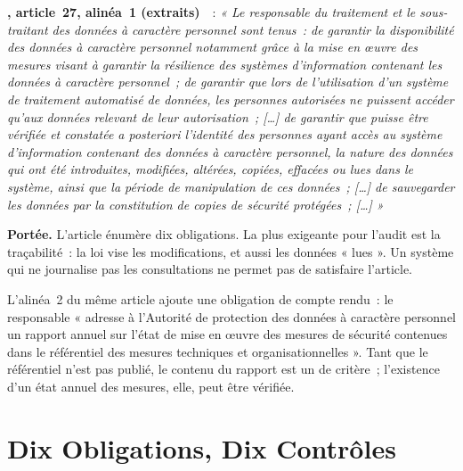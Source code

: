 \begin{boxjuris}
\textbf{, article~27, alinéa~1 (extraits)}~\cite{loi2024017}~:
\textit{« Le responsable du traitement et le sous-traitant des données à
caractère personnel sont tenus~: de garantir la disponibilité des données à
caractère personnel notamment grâce à la mise en œuvre des mesures visant à
garantir la résilience des systèmes d'information contenant les données à
caractère personnel~; de garantir que lors de l'utilisation d'un système de
traitement automatisé de données, les personnes autorisées ne puissent
accéder qu'aux données relevant de leur autorisation~; [\ldots] de
garantir que puisse être vérifiée et constatée a posteriori l'identité des
personnes ayant accès au système d'information contenant des données à
caractère personnel, la nature des données qui ont été introduites,
modifiées, altérées, copiées, effacées ou lues dans le système, ainsi que
la période de manipulation de ces données~; [\ldots] de sauvegarder les
données par la constitution de copies de sécurité protégées~; [\ldots] »}

\smallskip
\textbf{Portée.} L'article énumère dix obligations. La plus exigeante pour
l'audit est la traçabilité~: la loi vise les modifications, et aussi les
données « lues ». Un système qui ne journalise pas les
consultations ne permet pas de satisfaire l'article.
\end{boxjuris}

L'alinéa~2 du même article ajoute une obligation de compte rendu~: le
responsable « adresse à l'Autorité de protection des données à caractère
personnel un rapport annuel sur l'état de mise en œuvre des mesures de
sécurité contenues dans le référentiel des mesures techniques et
organisationnelles ». Tant que le référentiel n'est pas publié, le contenu
du rapport est un \NEK{} de critère~; l'existence d'un état annuel des
mesures, elle, peut être vérifiée.

\section{Dix Obligations, Dix Contrôles}
\label{sec:c07-controles}

